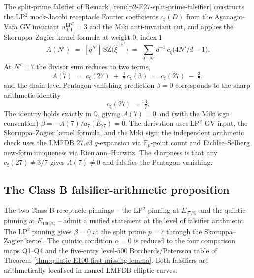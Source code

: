 \begin{remark}[Skoruppa--Zagier kernel: \texorpdfstring{$\beta = 0$}{beta = 0} at \texorpdfstring{$p = 7$}{p = 7}]
\label{rem:lp2-E27-sz-kernel}
The split-prime falsifier of
Remark~\ref{rem:lp2-E27-split-prime-falsifier} constructs the
LP$^{2}$ mock-Jacobi receptacle Fourier coefficients
$c_{\xi}(D)$ from the Aganagic--Vafa GV invariant
$n^{\mathrm{LP}^{2}}_{0,1} = 3$ and the Miki anti-invariant cut, and
applies the Skoruppa--Zagier kernel formula at weight $0$, index $1$
\[
 A(N')\;=\; [q^{N'}]\,\mathrm{SZ}\bigl(\widehat{\xi}^{\mathrm{LP}^{2}}\bigr)
 \;=\; \sum_{d \mid N'} d^{-1}\, c_{\xi}\bigl(4 N'/d - 1\bigr).
\]
At $N' = 7$ the divisor sum reduces to two terms,
\[
 A(7)\;=\; c_{\xi}(27) \;+\; \tfrac{1}{7}\, c_{\xi}(3)
 \;=\; c_{\xi}(27) \;-\; \tfrac{3}{7},
\]
and the chain-level Pentagon-vanishing prediction $\beta = 0$ corresponds
to the sharp arithmetic identity
\[
 \boxed{\;c_{\xi}(27) \;=\; \tfrac{3}{7}.\;}
\]
The identity holds exactly in $\mathbb{Q}$, giving $A(7) = 0$ and
(with the Miki sign convention)
$\beta = -A(7)/a_{7}(E_{27}) = 0$. The derivation uses LP$^{2}$ GV
input, the Skoruppa--Zagier kernel formula, and the Miki sign; the
independent arithmetic check uses the LMFDB \(27.a3\) \(q\)-expansion
via \(\mathbb F_p\)-point count and Eichler--Selberg new-form
uniqueness via Riemann--Hurwitz. The sharpness is that any
\(c_\xi(27)\neq 3/7\) gives \(A(7)\neq 0\) and falsifies the Pentagon
vanishing.
\end{remark}



\subsection{The Class B falsifier-arithmetic proposition}
\label{subsec:class-B-falsifier-arithmetic}

The two Class B receptacle pinnings -- the LP$^{2}$ pinning at
$E_{27/\mathbb{Q}}$ and the quintic pinning at $E_{100/\mathbb{Q}}$ -- admit
a unified statement at the level of falsifier arithmetic. The LP$^{2}$
pinning gives \(\beta=0\) at the split prime \(p=7\) through the
Skoruppa--Zagier kernel. The quintic condition \(\alpha=0\) is reduced
to the four comparison maps \textup{Q1}--\textup{Q4} and the
five-entry level-$500$ Borcherds/Petersson table of
Theorem~\ref{thm:quintic-E100-first-missing-lemma}. Both falsifiers are
arithmetically localised in named LMFDB elliptic curves.

